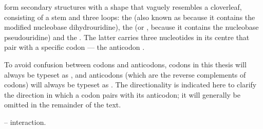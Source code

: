 \trna[s]
form secondary structures with a shape that vaguely resembles a
cloverleaf, consisting of a stem and three loops: the  (also
known as  because it contains the modified nucleobase
dihydrouridine), the  (or , because it contains
the nucleobase pseudouridine) and the . The latter
carries three nucleotides in its centre that pair with a specific codon --- the
anticodon \citep{Kim:1973,Suddath:1974,Robertus:1974,Rich:1978,Schimmel:1979}.

To avoid confusion between codons and anticodons, codons in this thesis will
always be typeset as , and anticodons (which are the
reverse complements of codons) will always be typeset as
. The directionality is indicated here to clarify the
direction in which a codon pairs with its anticodon; it will generally be
omitted in the remainder of the text.

    {-- interaction.}
    {}

